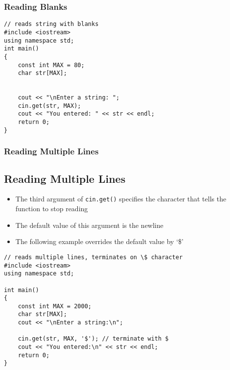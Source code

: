 \documentclass{beamer}
\begin{document}
\begin{frame}[fragile]\frametitle{Reading Blanks}
    \lstset{style=mystyle}
\begin{lstlisting}
// reads string with blanks
#include <iostream>
using namespace std;
int main()
{
    const int MAX = 80;
    char str[MAX];


    cout << "\nEnter a string: ";
    cin.get(str, MAX);
    cout << "You entered: " << str << endl;
    return 0;
}
\end{lstlisting}
\end{frame}

\begin{frame}[fragile]\frametitle{Reading Multiple Lines}
\subsection{Reading Multiple Lines} %
\label{sub:reading_multiple_lines}
\begin{itemize}
    \item The third argument of \texttt{cin.get()} specifies the character that tells the function to stop reading
    \item The default value of this argument is the newline
    \item The following example overrides the default value by `\$'
\end{itemize}
    \lstset{style=mystyle}
\begin{lstlisting}
// reads multiple lines, terminates on \$ character
#include <iostream>
using namespace std;

int main()
{
    const int MAX = 2000;
    char str[MAX];
    cout << "\nEnter a string:\n";

    cin.get(str, MAX, '$'); // terminate with $
    cout << "You entered:\n" << str << endl;
    return 0;
}
\end{lstlisting}
\end{frame}
\end{document}
